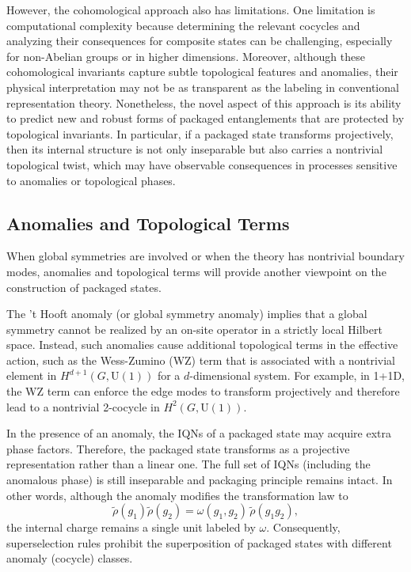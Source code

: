 \documentclass[12pt,a4paper]{article}
\begin{document}
However, the cohomological approach also has limitations.
One limitation is computational complexity because determining the relevant cocycles and analyzing their consequences for composite states can be challenging, especially for non-Abelian groups or in higher dimensions.
Moreover, although these cohomological invariants capture subtle topological features and anomalies, their physical interpretation may not be as transparent as the labeling in conventional representation theory.
Nonetheless, the novel aspect of this approach is its ability to predict new and robust forms of packaged entanglements that are protected by topological invariants.
In particular, if a packaged state transforms projectively, then its internal structure is not only inseparable but also carries a nontrivial topological twist, which may have observable consequences in processes sensitive to anomalies or topological phases.



\subsection{Anomalies and Topological Terms}
\label{SEC:AnomaliesAndTopologicalTerms}

When global symmetries are involved or when the theory has nontrivial boundary modes, anomalies and topological terms will provide another viewpoint on the construction of packaged states.


The 't Hooft anomaly \cite{tHooft1976} (or global symmetry anomaly) implies that a global symmetry cannot be realized by an on-site operator in a strictly local Hilbert space.
Instead, such anomalies cause additional topological terms in the effective action, such as the Wess-Zumino (WZ) term \cite{WessZumino1971} that is associated with a nontrivial element in $H^{d+1}(G, \mathrm{U}(1))$ for a $d$-dimensional system.
For example, in 1+1D, the WZ term can enforce the edge modes to transform projectively and therefore lead to a nontrivial 2-cocycle in $H^2(G, \mathrm{U}(1))$.


In the presence of an anomaly, the IQNs of a packaged state may acquire extra phase factors. Therefore, the packaged state transforms as a projective representation rather than a linear one.
The full set of IQNs (including the anomalous phase) is still inseparable and packaging principle remains intact.
In other words, although the anomaly modifies the transformation law to
\[
\tilde{\rho}(g_1)\tilde{\rho}(g_2) = \omega(g_1, g_2)\, \tilde{\rho}(g_1g_2),
\]
the internal charge remains a single unit labeled by $\omega$.
Consequently, superselection rules prohibit the superposition of packaged states with different anomaly (cocycle) classes.
\end{document}
